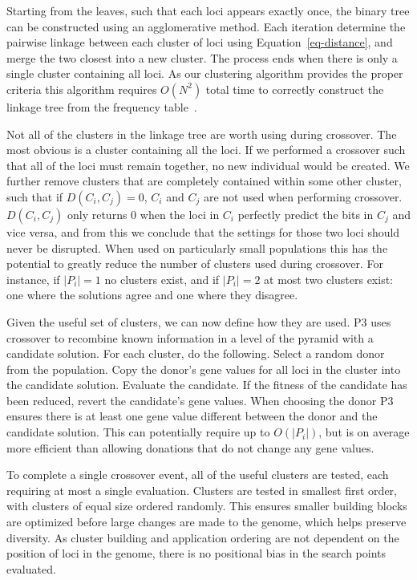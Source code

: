 \documentclass{sig-alternate}
\begin{document}
Starting from the leaves, such that each loci appears exactly once, the binary tree
can be constructed using an agglomerative method.  Each iteration determine the
pairwise linkage between each cluster of loci using Equation~\ref{eq-distance},
and merge the two closest into a new cluster.  The process ends when there is only
a single cluster containing all loci.  As our clustering algorithm provides the proper
criteria this algorithm requires $O(N^2)$ total time to correctly construct the linkage tree
from the frequency table~\cite{gronau:2007:upgma}.

Not all of the clusters in the linkage tree are worth using during crossover.  The most
obvious is a cluster containing all the loci.  If we performed a crossover such that all
of the loci must remain together, no new individual would be created.  We further remove
clusters that are completely contained within some other cluster, such that if
$D(C_i,C_j) = 0$, $C_i$ and $C_j$ are not used when performing crossover.  $D(C_i,C_j)$ only
returns $0$ when the loci in $C_i$ perfectly predict the bits in $C_j$ and vice versa,
and from this we conclude that the settings for those two loci should never be disrupted.
When used on particularly small populations this has the potential to greatly reduce the number
of clusters used during crossover.  For instance, if $|P_i| = 1$ no clusters exist, and if $|P_i| = 2$
at most two clusters exist: one where the solutions agree and one where they disagree.

Given the useful set of clusters, we can now define how they are used.  P3 uses
crossover to recombine known information in a level of the pyramid with a candidate
solution.  For each cluster, do the following.  Select a random donor from the population.
Copy the donor's gene values for all loci in the cluster into the candidate solution.
Evaluate the candidate.  If the fitness of the candidate has been reduced, revert the candidate's
gene values.  When choosing the donor P3 ensures there is at least one gene value
different between the donor and the candidate solution.  This can potentially require
up to $O(|P_i|)$, but is on average more efficient than allowing donations that
do not change any gene values.

To complete a single crossover event, all of the useful clusters are tested, each
requiring at most a single evaluation.  Clusters are tested in smallest first order,
with clusters of equal size ordered randomly.  This ensures smaller building blocks
are optimized before large changes are made to the genome, which helps preserve
diversity.  As cluster building and application ordering are not dependent on
the position of loci in the genome, there is no positional bias in the search points
evaluated.
\end{document}
